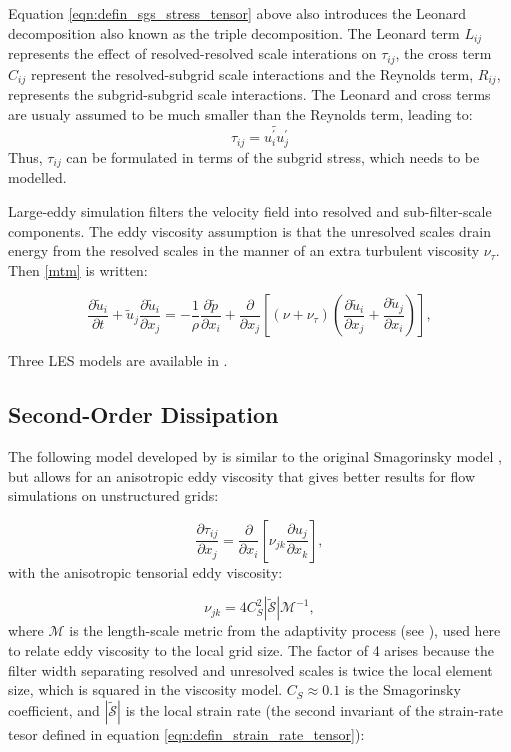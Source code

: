 Equation \eqref{eqn:defin_sgs_stress_tensor} above also introduces the Leonard decomposition
\citep{leonard1974} also known as the triple decomposition. The Leonard term $L_{ij}$ represents
the effect of resolved-resolved scale interations on $\tau_{ij}$, the cross term
$C_{ij}$ represent the resolved-subgrid scale interactions and 
the Reynolds term, $R_{ij}$, represents the subgrid-subgrid scale interactions.
The Leonard and cross terms are usualy assumed to be much smaller than the Reynolds term, leading to:
\begin{equation}
\tau_{ij} = \widetilde{u_i^\prime u_j^\prime}
\end{equation}
Thus, $\tau_{ij}$ can be formulated in terms of the subgrid stress, which needs
to be modelled.

Large-eddy simulation filters the velocity field into resolved and sub-filter-scale components. The eddy viscosity assumption is that the unresolved scales drain energy from the resolved scales in the manner of an extra turbulent viscosity $\nu_\tau$. Then \eqref{mtm} is written:

\begin{equation}
\frac{\partial \tilde u_i}{\partial t} + \tilde u_j \frac{\partial \tilde u_i}{\partial x_j}
 = -\frac 1 \rho \frac{\partial \tilde p}{\partial x_i}
 + \frac{\partial}{\partial x_j} \left [ (\nu + \nu_\tau) \left ( \frac{\partial \tilde u_i}{\partial x_j} + \frac{\partial \tilde u_j}{\partial x_i} \right ) \right ],
\end{equation}

Three LES models are available in \fluidity.

\subsection{Second-Order Dissipation}
\label{ssect:second_order_diss_LES}

The following model developed by \citet{bentham2003} is similar to the original Smagorinsky model \citep{smagorinsky1963general}, but allows for an anisotropic eddy viscosity that gives better results for flow simulations on unstructured grids:

\begin{equation}
\frac{\partial \tau_{ij}}{\partial x_j} = \frac{\partial}{\partial x_i} \left [ \nu_{jk}\frac{\partial u_j}{\partial x_k} \right ],
\end{equation}
with the anisotropic tensorial eddy viscosity:

\begin{equation}
\nu_{jk} = 4C_S^2 \left | \mathcal{\tilde S} \right | \mathcal{M}^{-1},
\end{equation}
where $\mathcal{M}$ is the length-scale metric from the adaptivity process (see \citet{pain2001}),
used here to relate eddy viscosity to the local grid size. The factor of 4 arises because the filter
width separating resolved and unresolved scales is twice the local element size, which is squared in
the viscosity model. $C_S \approx 0.1$ is the Smagorinsky coefficient, and
$\left | \mathcal{\tilde S} \right |$ is the local strain rate (the second invariant of the strain-rate
tesor defined in equation \eqref{eqn:defin_strain_rate_tensor}):

